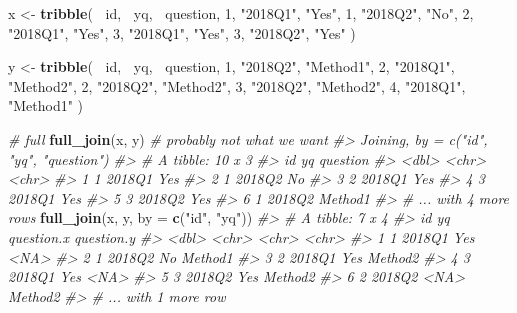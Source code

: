\documentclass[]{book}
\newenvironment{Shaded}{\begin{snugshade}}{\end{snugshade}}
\newcommand{\CommentTok}[1]{\textcolor[rgb]{0.56,0.35,0.01}{\textit{#1}}}
\newcommand{\DataTypeTok}[1]{\textcolor[rgb]{0.13,0.29,0.53}{#1}}
\newcommand{\DecValTok}[1]{\textcolor[rgb]{0.00,0.00,0.81}{#1}}
\newcommand{\KeywordTok}[1]{\textcolor[rgb]{0.13,0.29,0.53}{\textbf{#1}}}
\newcommand{\NormalTok}[1]{#1}
\newcommand{\OperatorTok}[1]{\textcolor[rgb]{0.81,0.36,0.00}{\textbf{#1}}}
\newcommand{\StringTok}[1]{\textcolor[rgb]{0.31,0.60,0.02}{#1}}
\theoremstyle{definition}
\theoremstyle{definition}
\theoremstyle{definition}
\theoremstyle{remark}
\begin{document}
\begin{Shaded}
\begin{Highlighting}[]
\NormalTok{x <-}\StringTok{ }\KeywordTok{tribble}\NormalTok{(}
  \OperatorTok{~}\NormalTok{id, }\OperatorTok{~}\NormalTok{yq, }\OperatorTok{~}\NormalTok{question,}
     \DecValTok{1}\NormalTok{, }\StringTok{"2018Q1"}\NormalTok{, }\StringTok{"Yes"}\NormalTok{,}
     \DecValTok{1}\NormalTok{, }\StringTok{"2018Q2"}\NormalTok{, }\StringTok{"No"}\NormalTok{,}
     \DecValTok{2}\NormalTok{, }\StringTok{"2018Q1"}\NormalTok{, }\StringTok{"Yes"}\NormalTok{,}
     \DecValTok{3}\NormalTok{, }\StringTok{"2018Q1"}\NormalTok{, }\StringTok{"Yes"}\NormalTok{,}
     \DecValTok{3}\NormalTok{, }\StringTok{"2018Q2"}\NormalTok{, }\StringTok{"Yes"}
\NormalTok{)}

\NormalTok{y <-}\StringTok{ }\KeywordTok{tribble}\NormalTok{(}
  \OperatorTok{~}\NormalTok{id, }\OperatorTok{~}\NormalTok{yq, }\OperatorTok{~}\NormalTok{question,}
     \DecValTok{1}\NormalTok{, }\StringTok{"2018Q2"}\NormalTok{, }\StringTok{"Method1"}\NormalTok{,}
     \DecValTok{2}\NormalTok{, }\StringTok{"2018Q1"}\NormalTok{, }\StringTok{"Method2"}\NormalTok{,}
     \DecValTok{2}\NormalTok{, }\StringTok{"2018Q2"}\NormalTok{, }\StringTok{"Method2"}\NormalTok{,}
     \DecValTok{3}\NormalTok{, }\StringTok{"2018Q2"}\NormalTok{, }\StringTok{"Method2"}\NormalTok{,}
     \DecValTok{4}\NormalTok{, }\StringTok{"2018Q1"}\NormalTok{, }\StringTok{"Method1"}
\NormalTok{)}

\CommentTok{# full}
\KeywordTok{full_join}\NormalTok{(x, y)                          }\CommentTok{# probably not what we want}
\CommentTok{#> Joining, by = c("id", "yq", "question")}
\CommentTok{#> # A tibble: 10 x 3}
\CommentTok{#>      id yq     question}
\CommentTok{#>   <dbl> <chr>  <chr>   }
\CommentTok{#> 1     1 2018Q1 Yes     }
\CommentTok{#> 2     1 2018Q2 No      }
\CommentTok{#> 3     2 2018Q1 Yes     }
\CommentTok{#> 4     3 2018Q1 Yes     }
\CommentTok{#> 5     3 2018Q2 Yes     }
\CommentTok{#> 6     1 2018Q2 Method1 }
\CommentTok{#> # ... with 4 more rows}
\KeywordTok{full_join}\NormalTok{(x, y, }\DataTypeTok{by =} \KeywordTok{c}\NormalTok{(}\StringTok{"id"}\NormalTok{, }\StringTok{"yq"}\NormalTok{))}
\CommentTok{#> # A tibble: 7 x 4}
\CommentTok{#>      id yq     question.x question.y}
\CommentTok{#>   <dbl> <chr>  <chr>      <chr>     }
\CommentTok{#> 1     1 2018Q1 Yes        <NA>      }
\CommentTok{#> 2     1 2018Q2 No         Method1   }
\CommentTok{#> 3     2 2018Q1 Yes        Method2   }
\CommentTok{#> 4     3 2018Q1 Yes        <NA>      }
\CommentTok{#> 5     3 2018Q2 Yes        Method2   }
\CommentTok{#> 6     2 2018Q2 <NA>       Method2   }
\CommentTok{#> # ... with 1 more row}
\end{Highlighting}
\end{Shaded}
\end{document}
